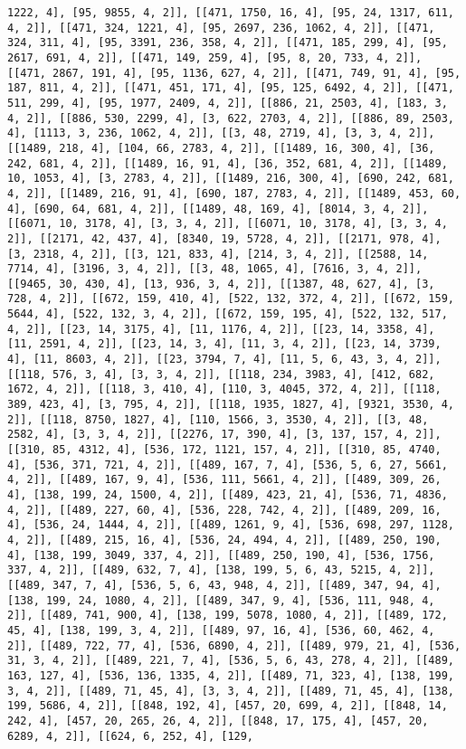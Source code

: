 \documentclass[12pt,fleqn]{article}\usepackage{../../common}
\begin{document}
\begin{verbatim}
1222, 4], [95, 9855, 4, 2]], [[471, 1750, 16, 4], [95, 24, 1317, 611, 4, 2]], [[471, 324, 1221, 4], [95, 2697, 236, 1062, 4, 2]], [[471, 324, 311, 4], [95, 3391, 236, 358, 4, 2]], [[471, 185, 299, 4], [95, 2617, 691, 4, 2]], [[471, 149, 259, 4], [95, 8, 20, 733, 4, 2]], [[471, 2867, 191, 4], [95, 1136, 627, 4, 2]], [[471, 749, 91, 4], [95, 187, 811, 4, 2]], [[471, 451, 171, 4], [95, 125, 6492, 4, 2]], [[471, 511, 299, 4], [95, 1977, 2409, 4, 2]], [[886, 21, 2503, 4], [183, 3, 4, 2]], [[886, 530, 2299, 4], [3, 622, 2703, 4, 2]], [[886, 89, 2503, 4], [1113, 3, 236, 1062, 4, 2]], [[3, 48, 2719, 4], [3, 3, 4, 2]], [[1489, 218, 4], [104, 66, 2783, 4, 2]], [[1489, 16, 300, 4], [36, 242, 681, 4, 2]], [[1489, 16, 91, 4], [36, 352, 681, 4, 2]], [[1489, 10, 1053, 4], [3, 2783, 4, 2]], [[1489, 216, 300, 4], [690, 242, 681, 4, 2]], [[1489, 216, 91, 4], [690, 187, 2783, 4, 2]], [[1489, 453, 60, 4], [690, 64, 681, 4, 2]], [[1489, 48, 169, 4], [8014, 3, 4, 2]], [[6071, 10, 3178, 4], [3, 3, 4, 2]], [[6071, 10, 3178, 4], [3, 3, 4, 2]], [[2171, 42, 437, 4], [8340, 19, 5728, 4, 2]], [[2171, 978, 4], [3, 2318, 4, 2]], [[3, 121, 833, 4], [214, 3, 4, 2]], [[2588, 14, 7714, 4], [3196, 3, 4, 2]], [[3, 48, 1065, 4], [7616, 3, 4, 2]], [[9465, 30, 430, 4], [13, 936, 3, 4, 2]], [[1387, 48, 627, 4], [3, 728, 4, 2]], [[672, 159, 410, 4], [522, 132, 372, 4, 2]], [[672, 159, 5644, 4], [522, 132, 3, 4, 2]], [[672, 159, 195, 4], [522, 132, 517, 4, 2]], [[23, 14, 3175, 4], [11, 1176, 4, 2]], [[23, 14, 3358, 4], [11, 2591, 4, 2]], [[23, 14, 3, 4], [11, 3, 4, 2]], [[23, 14, 3739, 4], [11, 8603, 4, 2]], [[23, 3794, 7, 4], [11, 5, 6, 43, 3, 4, 2]], [[118, 576, 3, 4], [3, 3, 4, 2]], [[118, 234, 3983, 4], [412, 682, 1672, 4, 2]], [[118, 3, 410, 4], [110, 3, 4045, 372, 4, 2]], [[118, 389, 423, 4], [3, 795, 4, 2]], [[118, 1935, 1827, 4], [9321, 3530, 4, 2]], [[118, 8750, 1827, 4], [110, 1566, 3, 3530, 4, 2]], [[3, 48, 2582, 4], [3, 3, 4, 2]], [[2276, 17, 390, 4], [3, 137, 157, 4, 2]], [[310, 85, 4312, 4], [536, 172, 1121, 157, 4, 2]], [[310, 85, 4740, 4], [536, 371, 721, 4, 2]], [[489, 167, 7, 4], [536, 5, 6, 27, 5661, 4, 2]], [[489, 167, 9, 4], [536, 111, 5661, 4, 2]], [[489, 309, 26, 4], [138, 199, 24, 1500, 4, 2]], [[489, 423, 21, 4], [536, 71, 4836, 4, 2]], [[489, 227, 60, 4], [536, 228, 742, 4, 2]], [[489, 209, 16, 4], [536, 24, 1444, 4, 2]], [[489, 1261, 9, 4], [536, 698, 297, 1128, 4, 2]], [[489, 215, 16, 4], [536, 24, 494, 4, 2]], [[489, 250, 190, 4], [138, 199, 3049, 337, 4, 2]], [[489, 250, 190, 4], [536, 1756, 337, 4, 2]], [[489, 632, 7, 4], [138, 199, 5, 6, 43, 5215, 4, 2]], [[489, 347, 7, 4], [536, 5, 6, 43, 948, 4, 2]], [[489, 347, 94, 4], [138, 199, 24, 1080, 4, 2]], [[489, 347, 9, 4], [536, 111, 948, 4, 2]], [[489, 741, 900, 4], [138, 199, 5078, 1080, 4, 2]], [[489, 172, 45, 4], [138, 199, 3, 4, 2]], [[489, 97, 16, 4], [536, 60, 462, 4, 2]], [[489, 722, 77, 4], [536, 6890, 4, 2]], [[489, 979, 21, 4], [536, 31, 3, 4, 2]], [[489, 221, 7, 4], [536, 5, 6, 43, 278, 4, 2]], [[489, 163, 127, 4], [536, 136, 1335, 4, 2]], [[489, 71, 323, 4], [138, 199, 3, 4, 2]], [[489, 71, 45, 4], [3, 3, 4, 2]], [[489, 71, 45, 4], [138, 199, 5686, 4, 2]], [[848, 192, 4], [457, 20, 699, 4, 2]], [[848, 14, 242, 4], [457, 20, 265, 26, 4, 2]], [[848, 17, 175, 4], [457, 20, 6289, 4, 2]], [[624, 6, 252, 4], [129, 
\end{verbatim}
\end{document}
